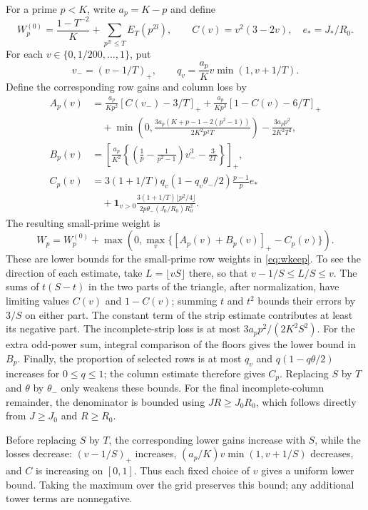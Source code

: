 For a prime $p<K$, write $a_p=K-p$ and define
\[
 W_p^{(0)}=\frac{1-T^{-2}}K+
                      \sum_{p^{2l}\leq T}E_T(p^{2l}),
 \qquad C(v)=v^2(3-2v),\quad e_* =J_*/R_0.
\]
For each $v\in\{0,1/200,\ldots,1\}$, put
\[
 v_-=(v-1/T)_+,\qquad q_v=\frac{a_p}{K}v\min(1,v+1/T).
\]
Define the corresponding row gains and column loss by
\begin{align*}
 A_p(v)&=\frac{a_p}{Kp^2}[C(v_-)-3/T]_+
          +\frac{a_p}{Kp^3}[1-C(v)-6/T]_+\\
 &\quad+\min\left(0,\frac{3a_p(K+p-1-2(p^2-1))}{2K^2p^2T}\right)
                  -\frac{3a_pp^2}{2K^2T^2},\\
 B_p(v)&=\left[\frac{a_p}{K^2}
     \left\{\left(\frac1p-\frac1{p^2-1}\right)v_-^3-\frac3{2T}\right\}
                                                        \right]_+,\\
 C_p(v)&=3(1+1/T)q_v(1-q_v\theta_-/2)\frac{p-1}{p}e_*\\
 &\quad+\boldsymbol1_{v>0}
       \frac{3(1+1/T)\lfloor p^2/4\rfloor}
                  {2p\theta_-(J_0/R_0)R_0^2}.
\end{align*}
The resulting small-prime weight is
\[
 W_p=W_p^{(0)}+
       \max\left(0,\max_v\{[A_p(v)+B_p(v)]_+-C_p(v)\}\right).
\]
These are lower bounds for the small-prime row weights in
\eqref{eq:wkeep}. To see the direction of each estimate, take
$L=\lfloor vS\rfloor$ there, so that $v-1/S\leq L/S\leq v$.
The sums of $t(S-t)$ in the two parts of the triangle, after
normalization, have limiting values $C(v)$ and $1-C(v)$; summing
$t$ and $t^2$ bounds their errors by $3/S$ on either part.
The constant term of the strip estimate contributes at least its
negative part. The incomplete-strip loss is at most
$3a_pp^2/(2K^2S^2)$. For the extra odd-power sum, integral comparison
of the floors gives the lower bound in $B_p$.
Finally, the proportion of selected rows is at most $q_v$ and
$q(1-q\theta/2)$ increases for $0\leq q\leq1$; the column estimate
therefore gives $C_p$. Replacing $S$ by $T$ and $\theta$ by $\theta_-$ only weakens these bounds.
For the final incomplete-column remainder, the denominator is bounded using
$JR\geq J_0R_0$, which follows directly from
$J\geq J_0$ and $R\geq R_0$.

Before replacing $S$ by $T$, the corresponding lower gains increase with
$S$, while the losses decrease: $(v-1/S)_+$ increases,
$(a_p/K)v\min(1,v+1/S)$ decreases, and $C$ is increasing on $[0,1]$.
Thus each fixed choice of $v$ gives a uniform lower bound. Taking the
maximum over the grid preserves this bound; any additional tower terms
are nonnegative.


